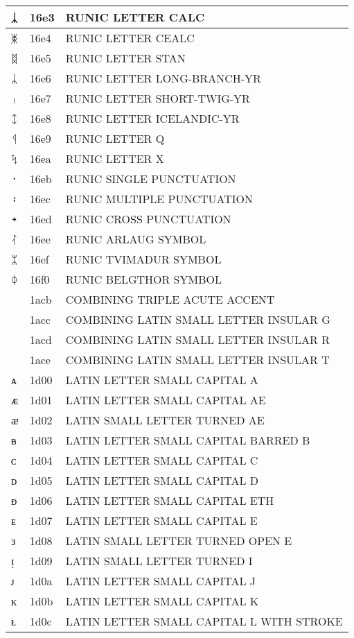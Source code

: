 \documentclass[12pt,letterpaper,openany]{book}
\begin{document}
\begin{center}
\begin{supertabular}{|m{0.25in}|m{0.5in}|m{4in}|}
ᛣ & 16e3 & RUNIC LETTER CALC\\\hline
ᛤ & 16e4 & RUNIC LETTER CEALC\\\hline
ᛥ & 16e5 & RUNIC LETTER STAN\\\hline
ᛦ & 16e6 & RUNIC LETTER LONG-BRANCH-YR\\\hline
ᛧ & 16e7 & RUNIC LETTER SHORT-TWIG-YR\\\hline
ᛨ & 16e8 & RUNIC LETTER ICELANDIC-YR\\\hline
ᛩ & 16e9 & RUNIC LETTER Q\\\hline
ᛪ & 16ea & RUNIC LETTER X\\\hline
᛫ & 16eb & RUNIC SINGLE PUNCTUATION\\\hline
᛬ & 16ec & RUNIC MULTIPLE PUNCTUATION\\\hline
᛭ & 16ed & RUNIC CROSS PUNCTUATION\\\hline
ᛮ & 16ee & RUNIC ARLAUG SYMBOL\\\hline
ᛯ & 16ef & RUNIC TVIMADUR SYMBOL\\\hline
ᛰ & 16f0 & RUNIC BELGTHOR SYMBOL\\\hline
᫋ & 1acb & COMBINING TRIPLE ACUTE ACCENT\\\hline
ᫌ & 1acc & COMBINING LATIN SMALL LETTER INSULAR G\\\hline
ᫍ & 1acd & COMBINING LATIN SMALL LETTER INSULAR R\\\hline
ᫎ & 1ace & COMBINING LATIN SMALL LETTER INSULAR T\\\hline
ᴀ & 1d00 & LATIN LETTER SMALL CAPITAL A\\\hline
ᴁ & 1d01 & LATIN LETTER SMALL CAPITAL AE\\\hline
ᴂ & 1d02 & LATIN SMALL LETTER TURNED AE\\\hline
ᴃ & 1d03 & LATIN LETTER SMALL CAPITAL BARRED B\\\hline
ᴄ & 1d04 & LATIN LETTER SMALL CAPITAL C\\\hline
ᴅ & 1d05 & LATIN LETTER SMALL CAPITAL D\\\hline
ᴆ & 1d06 & LATIN LETTER SMALL CAPITAL ETH\\\hline
ᴇ & 1d07 & LATIN LETTER SMALL CAPITAL E\\\hline
ᴈ & 1d08 & LATIN SMALL LETTER TURNED OPEN E\\\hline
ᴉ & 1d09 & LATIN SMALL LETTER TURNED I\\\hline
ᴊ & 1d0a & LATIN LETTER SMALL CAPITAL J\\\hline
ᴋ & 1d0b & LATIN LETTER SMALL CAPITAL K\\\hline
ᴌ & 1d0c & LATIN LETTER SMALL CAPITAL L WITH STROKE\\\hline

\end{supertabular}
\end{center}
\end{document}
